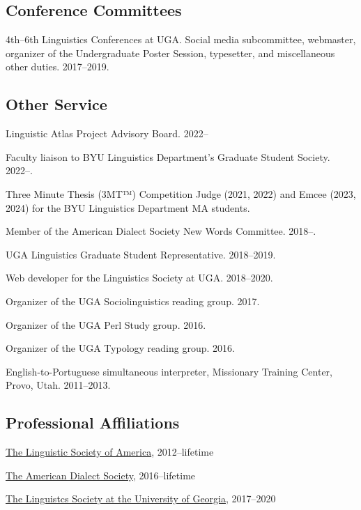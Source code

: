 \documentclass[
]{article}
\begin{document}
\hypertarget{conference-committees}{%
\subsection{Conference Committees}\label{conference-committees}}

4th--6th Linguistics Conferences at UGA. Social media subcommittee,
webmaster, organizer of the Undergraduate Poster Session, typesetter,
and miscellaneous other duties. 2017--2019.

\hypertarget{other-service}{%
\subsection{Other Service}\label{other-service}}

Linguistic Atlas Project Advisory Board. 2022--

Faculty liaison to BYU Linguistics Department's Graduate Student
Society. 2022--.

Three Minute Thesis (3MT™) Competition Judge (2021, 2022) and Emcee
(2023, 2024) for the BYU Linguistics Department MA students.

Member of the American Dialect Society New Words Committee. 2018--.

UGA Linguistics Graduate Student Representative. 2018--2019.

Web developer for the Linguistics Society at UGA. 2018--2020.

Organizer of the UGA Sociolinguistics reading group. 2017.

Organizer of the UGA Perl Study group. 2016.

Organizer of the UGA Typology reading group. 2016.

English-to-Portuguese simultaneous interpreter, Missionary Training
Center, Provo, Utah. 2011--2013.

\hypertarget{professional-affiliations}{%
\subsection{Professional Affiliations}\label{professional-affiliations}}

\href{http://www.linguisticsociety.org}{The Linguistic Society of
America}, 2012--lifetime

\href{http://www.americandialect.org}{The American Dialect Society},
2016--lifetime

\href{https://www.linguistics.uga.edu/lsuga}{The Linguistcs Society at
the University of Georgia}, 2017--2020
\end{document}
